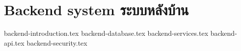 \section{\ifenglish Backend system \else ระบบหลังบ้าน \fi}

\newcommand{\dir}{chapters/approach/backend}
{backend-introduction.tex}
{backend-database.tex}
{backend-services.tex}
{backend-api.tex}
{backend-security.tex}